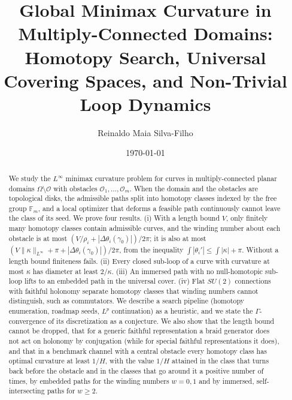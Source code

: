 \documentclass[11pt,reqno]{amsart}
\theoremstyle{definition}
\numberwithin{equation}{section}
\begin{document}
\title[Global Minimax Curvature via Homotopy and Covering Spaces]{Global Minimax Curvature in Multiply-Connected Domains: Homotopy Search, Universal Covering Spaces, and Non-Trivial Loop Dynamics}

\author{Reinaldo Maia Silva-Filho}
\address{Programa de P\'os-Gradua\c{c}\~ao em Estat\'istica e Experimenta\c{c}\~ao Agropecu\'aria (PPGEE/DES), Universidade Federal de Lavras (UFLA)}

\date{\today}

\begin{abstract}
We study the $L^\infty$ minimax curvature problem for curves in multiply-connected planar domains $\Omega \setminus \mathcal{O}$ with obstacles $\mathcal{O}_1, \dots, \mathcal{O}_m$. When the domain and the obstacles are topological disks, the admissible paths split into homotopy classes indexed by the free group $\mathbb{F}_m$, and a local optimizer that deforms a feasible path continuously cannot leave the class of its seed. We prove four results. (i) With a length bound $V$, only finitely many homotopy classes contain admissible curves, and the winding number about each obstacle is at most $(V/\rho_i + |\Delta\theta_i(\gamma_0)|)/2\pi$; it is also at most $(V\|\kappa\|_{L^\infty} + \pi + |\Delta\theta_i(\gamma_0)|)/2\pi$, from the inequality $\int|\theta_i'| \le \int|\kappa| + \pi$. Without a length bound finiteness fails. (ii) Every closed sub-loop of a curve with curvature at most $\kappa$ has diameter at least $2/\kappa$. (iii) An immersed path with no null-homotopic sub-loop lifts to an embedded path in the universal cover. (iv) Flat $SU(2)$ connections with faithful holonomy separate homotopy classes that winding numbers cannot distinguish, such as commutators. We describe a search pipeline (homotopy enumeration, roadmap seeds, $L^p$ continuation) as a heuristic, and we state the $\Gamma$-convergence of its discretization as a conjecture. We also show that the length bound cannot be dropped, that for a generic faithful representation a braid generator does not act on holonomy by conjugation (while for special faithful representations it does), and that in a benchmark channel with a central obstacle every homotopy class has optimal curvature at least $1/H$, with the value $1/H$ attained in the class that turns back before the obstacle and in the classes that go around it a positive number of times, by embedded paths for the winding numbers $w = 0, 1$ and by immersed, self-intersecting paths for $w \ge 2$.
\end{abstract}
\end{document}
